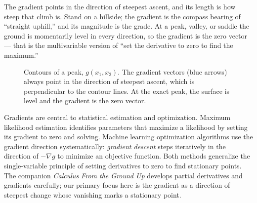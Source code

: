 \begin{intuitionbox}
The gradient points in the direction of steepest ascent, and its length is how steep that climb is.
Stand on a hillside; the gradient is the compass bearing of ``straight uphill,'' and its magnitude is
the grade. At a peak, valley, or saddle the ground is momentarily level in every direction, so the
gradient is the zero vector --- that is the multivariable version of ``set the derivative to zero to
find the maximum.''
\end{intuitionbox}

\begin{figure}[htbp]
\centering
{}
\caption{Contours of a peak, $g(x_1,x_2)$. The gradient vectors (blue arrows) always point in the direction of steepest ascent, which is perpendicular to the contour lines. At the exact peak, the surface is level and the gradient is the zero vector.}
\label{chAcla:fig-gradient}
\end{figure}

Gradients are central to statistical estimation and optimization. Maximum likelihood estimation
identifies parameters that maximize a likelihood by setting its gradient to zero and solving.
Machine learning optimization algorithms use the gradient direction systematically:
\emph{gradient descent} steps iteratively in the direction of $-\nabla g$ to minimize an objective
function. Both methods generalize the single-variable principle of setting derivatives to zero to
find stationary points. The companion \emph{Calculus From the
Ground Up} develops partial derivatives and gradients carefully; our primary focus here is the
gradient as a direction of steepest change whose vanishing marks a stationary point.

